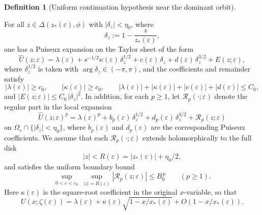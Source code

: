 \documentclass[11pt]{amsart}
\numberwithin{equation}{section}
\theoremstyle{plain}
\theoremstyle{definition}
\newtheorem{definition}[theorem]{Definition}
\theoremstyle{remark}
\begin{document}
\begin{definition}[Uniform continuation hypothesis near the dominant orbit]
\begin{enumerate}[label=(U\arabic*),leftmargin=2.5em]
		        For all $z\in\Delta(z_*(\varepsilon),\phi)$ with $|\delta_z|<\eta_0$, where
		      \[
			     \delta_z:=1-\frac{z}{z_*(\varepsilon)},
		      \]
		      one has a Puiseux expansion on the Taylor sheet of the form
		      \begin{equation}\label{eq:puiseux-uniform}
			      \widehat U(z;\varepsilon)
			      =
			      \lambda(\varepsilon)
			      +
				     s^{-1/2}\kappa(\varepsilon)\,\delta_z^{1/2}
			      +
				     c(\varepsilon)\,\delta_z
			      +
				    d(\varepsilon)\,\delta_z^{3/2}
			      +
			      E(z;\varepsilon),
		      \end{equation}
			    where $\delta_z^{1/2}$ is taken with $\arg\delta_z\in(-\pi,\pi)$, and the coefficients and remainder satisfy
		      \[
			      |\lambda(\varepsilon)|\ge c_0,\qquad |\kappa(\varepsilon)|\ge c_0,\qquad
			      |\lambda(\varepsilon)|+|\kappa(\varepsilon)|+|c(\varepsilon)|+|d(\varepsilon)|\le C_0,
		      \]
		      and $|E(z;\varepsilon)|\le C_0\,|\delta_z|^{2}$.
			  In addition, for each $p\ge1$, let $\mathcal R_p(\cdot;\varepsilon)$ denote the regular part in
		      the local expansion
		      \[
			      \widehat U(z;\varepsilon)^p
			      =
			      \lambda(\varepsilon)^p
			      +
			      b_p(\varepsilon)\,\delta_z^{1/2}
			      +
			      d_p(\varepsilon)\,\delta_z^{3/2}
			      +
			      \mathcal R_p(z;\varepsilon)
		      \]
		      on $\Omega_\varepsilon\cap\{|\delta_z|<\eta_0\}$, where $b_p(\varepsilon)$ and
		      $d_p(\varepsilon)$ are the corresponding Puiseux coefficients. We assume that each
		      $\mathcal R_p(\cdot;\varepsilon)$ extends holomorphically to the full disk
		      \[
			      |z|<R(\varepsilon)=|z_*(\varepsilon)|+\eta_0/2,
		      \]
		      and satisfies the uniform boundary bound
		      \[
			      \sup_{0<\varepsilon<\varepsilon_0}\ \sup_{|z|=R(\varepsilon)}
			      |\mathcal R_p(z;\varepsilon)|
			      \le B_0^{\,p}
			      \qquad (p\ge1).
		      \]
		      Here $\kappa(\varepsilon)$ is the square-root coefficient in the
		      original $x$-variable, so that
		      \[
			      U(x;\zeta(\varepsilon))
			      =
			      \lambda(\varepsilon)
			      +
			      \kappa(\varepsilon)\sqrt{1-x/x_*(\varepsilon)}
			      +
			      O\!\left(1-x/x_*(\varepsilon)\right).
		      \]
	\end{enumerate}
\end{definition}
\end{document}
